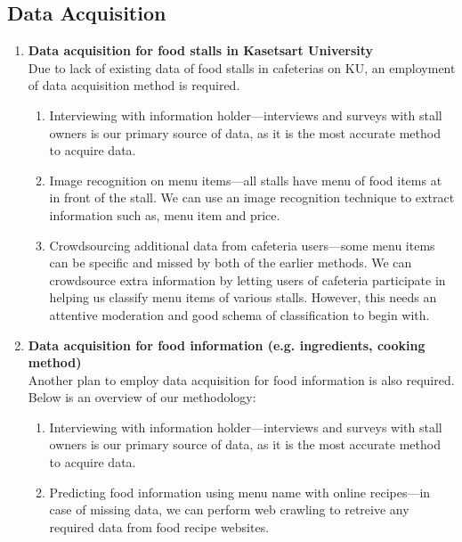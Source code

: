 \subsection{Data Acquisition}
\label{subsection:data-acquisition}

\begin{enumerate}[leftmargin=80pt]
    \item \textbf{Data acquisition for food stalls in Kasetsart University} \\%
        Due to lack of existing data of food stalls in cafeterias on KU, an employment of data acquisition method is required.
        \begin{enumerate}
            \item Interviewing with information holder---interviews and surveys with stall owners is our
            primary source of data, as it is the most accurate method to acquire data.
            \item Image recognition on menu items---all stalls have menu of food items at in front of the stall.
            We can use an image recognition technique to extract information such as, menu item and price.
            \item Crowdsourcing additional data from cafeteria users---some menu items can be specific and missed by
            both of the earlier methods. We can crowdsource extra information by letting users of cafeteria participate
            in helping us classify menu items of various stalls. However, this needs an attentive moderation and
            good schema of classification to begin with.
        \end{enumerate}
    \item \textbf{Data acquisition for food information (e.g. ingredients, cooking method)} \\%
        Another plan to employ data acquisition for food information is also required. Below is an overview of our methodology:
        \begin{enumerate}
            \item Interviewing with information holder---interviews and surveys with stall owners is our
            primary source of data, as it is the most accurate method to acquire data.
            \item Predicting food information using menu name with online recipes---in case of missing data, we can perform
            web crawling to retreive any required data from food recipe websites.
        \end{enumerate}
\end{enumerate}

